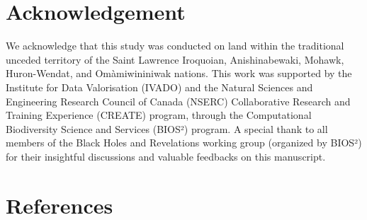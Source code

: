 \documentclass[10pt,oneside]{article}
\begin{document}
\hypertarget{acknowledgement}{%
\section{Acknowledgement}\label{acknowledgement}}

We acknowledge that this study was conducted on land within the
traditional unceded territory of the Saint Lawrence Iroquoian,
Anishinabewaki, Mohawk, Huron-Wendat, and Omàmiwininiwak nations. This
work was supported by the Institute for Data Valorisation (IVADO) and
the Natural Sciences and Engineering Research Council of Canada (NSERC)
Collaborative Research and Training Experience (CREATE) program, through
the Computational Biodiversity Science and Services (BIOS²) program. A
special thank to all members of the Black Holes and Revelations working
group (organized by BIOS²) for their insightful discussions and valuable
feedbacks on this manuscript.

\hypertarget{references}{%
\section*{References}\label{references}}
\end{document}
